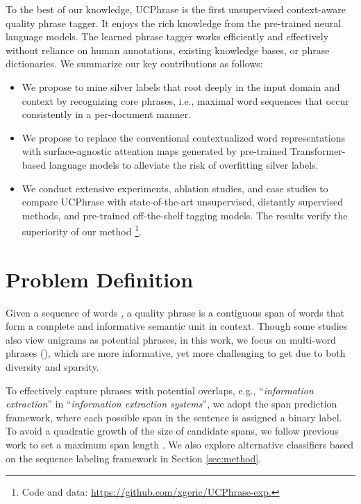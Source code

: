 \documentclass[sigconf]{acmart}
\newcommand{\our}{\mbox{UCPhrase}\xspace}
\newcommand{\ie}{\mbox{i.e.}\xspace}
\newcommand{\eg}{\mbox{e.g.}\xspace}
\newcommand{\example}[1]{``\emph{#1}''}
\begin{document}
\smallskip\noindent
To the best of our knowledge, \our is the first unsupervised context-aware quality phrase tagger.
It enjoys the rich knowledge from the pre-trained neural language models.
The learned phrase tagger works efficiently and effectively without reliance on human annotations, existing knowledge bases, or phrase dictionaries.
We summarize our key contributions as follows:
\begin{itemize}[leftmargin=*,nosep]
\item We propose to mine silver labels that root deeply in the input domain and context by recognizing core phrases, \ie, maximal word sequences that occur consistently in a per-document manner. 
\item We propose to replace the conventional contextualized word representations with surface-agnostic attention maps generated by pre-trained Transformer-based language models to alleviate the risk of overfitting silver labels.
\item We conduct extensive experiments, ablation studies, and case studies to compare \our with state-of-the-art unsupervised, distantly supervised methods, and pre-trained off-the-shelf tagging models. The results verify the superiority of our method
\footnote{Code and data: \href{https://github.com/xgeric/UCPhrase-reproduce}{\color{blue}https://github.com/xgeric/UCPhrase-exp.}}. 
\end{itemize}
 \section{Problem Definition}

Given a sequence of words , a quality phrase is a contiguous span of words  that form a complete and informative semantic unit in context.
Though some studies also view unigrams as potential phrases, in this work, we focus on multi-word phrases (), which are more informative, yet more challenging to get due to both diversity and sparsity.

To effectively capture phrases with potential overlaps, \eg, \example{information extraction} in \example{information extraction systems}, 
we adopt the span prediction framework, where each possible span in the sentence is assigned a binary label.
To avoid a quadratic growth of the size of candidate spans, we follow previous work \cite{liu2015mining, shang2018automated} to set a maximum span length .
We also explore alternative classifiers based on the sequence labeling framework in Section \ref{sec:method}.
\end{document}

